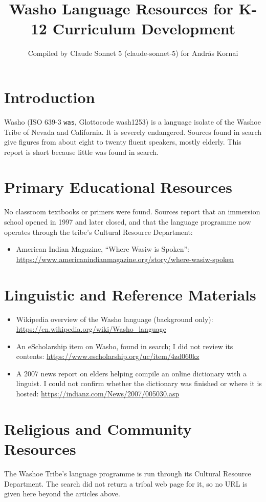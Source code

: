 \documentclass[12pt]{article}
\title{Washo Language Resources for K-12 Curriculum Development}
\author{Compiled by Claude Sonnet 5 (claude-sonnet-5) for Andr\'as Kornai}
\date{}
\begin{document}
\maketitle

\section{Introduction}
Washo (ISO 639-3 \texttt{was}, Glottocode wash1253) is a language isolate of the Washoe Tribe of Nevada and California. It is severely endangered. Sources found in search give figures from about eight to twenty fluent speakers, mostly elderly. This report is short because little was found in search.

\section{Primary Educational Resources}
No classroom textbooks or primers were found. Sources report that an immersion school opened in 1997 and later closed, and that the language programme now operates through the tribe's Cultural Resource Department:
\begin{itemize}
\item American Indian Magazine, ``Where Wasiw is Spoken'': \url{https://www.americanindianmagazine.org/story/where-wasiw-spoken}
\end{itemize}

\section{Linguistic and Reference Materials}
\begin{itemize}
\item Wikipedia overview of the Washo language (background only): \url{https://en.wikipedia.org/wiki/Washo_language}
\item An eScholarship item on Washo, found in search; I did not review its contents: \url{https://www.escholarship.org/uc/item/4zd060kz}
\item A 2007 news report on elders helping compile an online dictionary with a linguist. I could not confirm whether the dictionary was finished or where it is hosted: \url{https://indianz.com/News/2007/005030.asp}
\end{itemize}

\section{Religious and Community Resources}
The Washoe Tribe's language programme is run through its Cultural Resource Department. The search did not return a tribal web page for it, so no URL is given here beyond the articles above.
\end{document}
